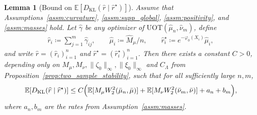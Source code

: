 \documentclass[10pt,a4paper]{amsart}
\newtheorem{lemma}{Lemma}
\newcommand{\Ep}{\mathbb{E}}
\newcommand{\KL}{\mathrm{KL}}
\renewcommand{\hat}{\widehat}
\begin{document}
\begin{lemma}[{Bound on $\Ep[D_\KL(\hat r\mid\hat r^\star)]$}]
\label{lem:uot_fitted_row_kl_expect}
Assume that Assumptions~\ref{assm:curvature}, \ref{assm:supp_global}, \ref{assm:positivity}, and \ref{assm:masses} hold.
Let $\hat\gamma$ be any optimizer of $\mathrm{UOT}(\hat\mu_n,\hat\nu_m)$, define
\begin{align*}
    \hat r_i \coloneqq \sum_{j=1}^m \hat\gamma_{ij},
    \qquad
    \hat\mu_i \coloneqq {\hat M_\mu/n},
    \qquad
    \hat r_i^\star \coloneqq e^{-\varphi_0(X_i)}\hat\mu_i,
\end{align*}
and write $\hat r=(\hat r_i)_{i=1}^n$ and $\hat r^\star=(\hat r_i^\star)_{i=1}^n$.
Then there exists a constant $C>0$, depending only on
\(
M_\mu,M_\nu,\|\zeta_0\|_\infty,\|\xi_0\|_\infty
\)
and $C_\Lambda$ from Proposition~\ref{prop:two_sample_stability}, such that for all sufficiently large $n,m$,
\begin{align}
\label{eq:uot_fitted_row_kl_expect}
    \Ep[{D_\KL}(\hat r\mid \hat r^\star)]
    \le
    C
    \Bigl(
        \Ep[M_\mu W_2^2(\bar\mu_n,\bar\mu)]
        + \Ep[M_\nu W_2^2(\bar\nu_m,\bar\nu)]
        + a_n + b_m
    \Bigr),
\end{align}
where $a_n,b_m$ are the rates from Assumption~\ref{assm:masses}.
\end{lemma}
\end{document}
